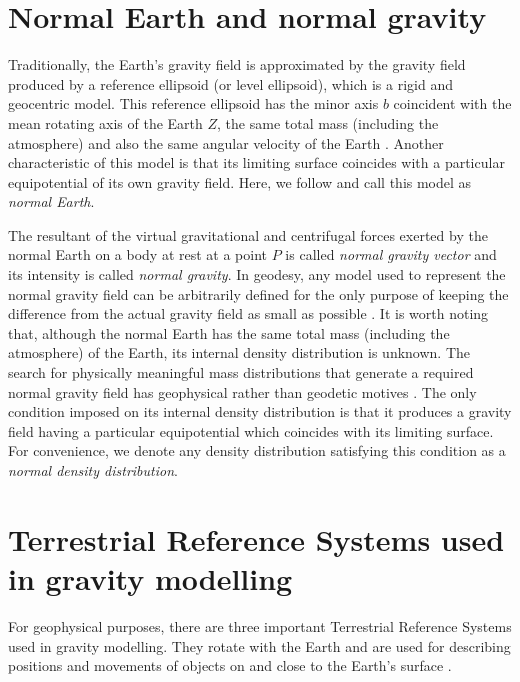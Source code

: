 \documentclass[extra]{gji}
\begin{document}
\section{Normal Earth and normal gravity}

Traditionally, the Earth's gravity field is approximated 
by the gravity field produced by a reference ellipsoid
(or level ellipsoid), which is a rigid and geocentric model.
This reference ellipsoid has the minor axis $b$ 
coincident with the mean rotating axis of the Earth $Z$, the 
same total mass (including the atmosphere) and also the
same angular velocity of the Earth \citep{heiskanen-moritz1967,
vanicek1987,hofmann-wellenhof-moritz2005,torge2012}.
Another characteristic of this model is that its
limiting surface coincides with a particular equipotential 
of its own gravity field.
Here, we follow \citep{torge2012} and call this model as
\textit{normal Earth}.

The resultant of the virtual 
gravitational and centrifugal forces exerted by the normal
Earth on a body at rest at a point $P$ is called 
\textit{normal gravity vector} and its intensity is called 
\textit{normal gravity}.
In geodesy, any model used to represent the normal gravity field
can be arbitrarily defined for the only purpose
of keeping the difference from the actual gravity field as small 
as possible \citep{vanicek1987}.
It is worth noting that, although the normal Earth has the
same total mass (including the atmosphere) of the Earth,
its internal density distribution is unknown.
The search for physically meaningful mass distributions 
that generate a required normal gravity field
has geophysical rather than geodetic motives \citep{marussi1974}.
The only condition imposed on its internal density
distribution is that it produces a gravity field
having a particular equipotential which coincides
with its limiting surface.
For convenience, we denote any density distribution
satisfying this condition as a \textit{normal density distribution}.


\section{Terrestrial Reference Systems used in gravity modelling}

For geophysical purposes, there are three important Terrestrial Reference Systems used in gravity modelling. 
They rotate with the Earth and are used for describing
positions and movements of objects on and close to the Earth’s surface
\citep{torge2012}.
\end{document}
